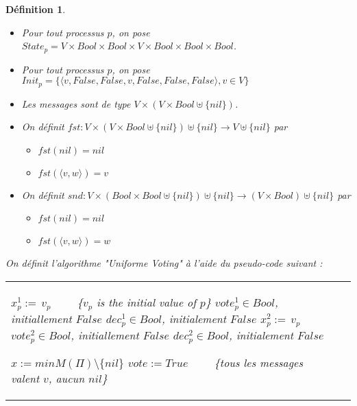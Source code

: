 \documentclass{article}
\newtheorem{definition}{Définition}
\begin{document}
\begin{definition}
\begin{itemize}

	\item Pour tout processus $p$, on pose
		$State_p = V \times Bool \times Bool \times V \times Bool \times Bool \times Bool$.
	\item Pour tout processus $p$, on pose
		$Init_p = \{\langle v, False, False, v, False, False, False \rangle, v \in V\}$
	\item Les messages sont de type $V \times (V \times Bool \uplus \{nil\})$.


	\item On définit $fst : V \times (V \times Bool \uplus \{nil\}) \uplus \{nil\} \rightarrow V \uplus \{nil\}$ par
	\begin{itemize}
		\item $fst(nil) = nil$
		\item $fst(\langle v, w \rangle) = v$
	\end{itemize}

	\item On définit $snd : V \times (Bool \times Bool \uplus \{nil\}) \uplus \{nil\} \rightarrow (V \times Bool) \uplus \{nil\}$ par
	\begin{itemize}
		\item $fst(nil) = nil$
		\item $fst(\langle v, w \rangle) = w$
	\end{itemize}
\end{itemize}

On définit l'algorithme "Uniforme Voting" à l'aide du pseudo-code suivant :
\begin{algorithm}[htb]
\scriptsize{
\begin{distribalgo}[1]
\begin{tabular}{ll}
\begin{minipage}{41em}


\INDENT{\textbf{Initialization:}}
	\STATE $x^1_p :=\, v_p$ ~~~~\{\emph{$v_p$ is the initial value of $p$}\}
	\STATE $vote^1_p \in Bool$, initiallement $False$
	\STATE $dec^1_p \in Bool$, initialement $False$
	\BLANK
	\STATE $x^2_p :=\, v_p$
	\STATE $vote^2_p \in Bool$, initiallement $False$
	\STATE $dec^2_p \in Bool$, initialement $False$

\ENDINDENT
\BLANK

\INDENT{\textbf{Fonctions sur une instance}}
	\INDENT{$T^1_p(M, ref ~ x, ref ~ vote, ref ~ dec):$}
		\STATE $ x := min M(\Pi) \setminus \{nil\}$ 
		\IF{$M(\Pi) = \{v\}$} 
			\STATE $vote := True$ ~~~~\{tous les messages valent $v$, aucun $nil$\}
		\ENDIF
	\ENDINDENT
	\BLANK


\end{minipage}
\end{tabular}
\end{distribalgo}}
\end{algorithm}
\end{definition}
\end{document}
